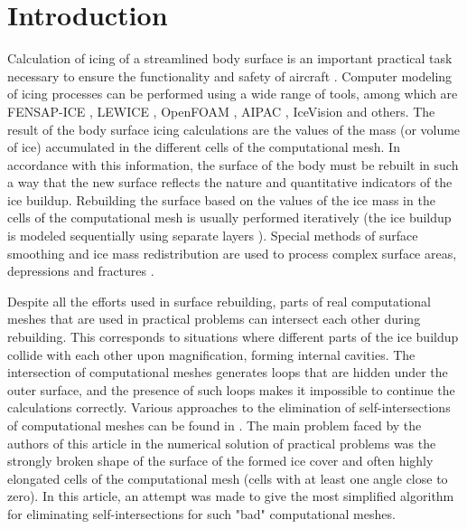 \documentclass[
11pt,%
tightenlines,%
twoside,%
onecolumn,%
nofloats,%
nobibnotes,%
nofootinbib,%
superscriptaddress,%
noshowpacs,%
centertags]%
{revtex4}
\begin{document}
\maketitle

\section{Introduction}

Calculation of icing of a streamlined body surface is an important practical task necessary to ensure the functionality and safety of aircraft \cite{Myers, Farzaneh, Dong, Beaugendre}.
Computer modeling of icing processes can be performed using a wide range of tools, among which are FENSAP-ICE \cite{Bourgault}, LEWICE \cite{Wright}, OpenFOAM \cite{Beld}, AIPAC \cite{Domingos}, IceVision \cite{Aksenov} and others.
The result of the body surface icing calculations are the values of the mass (or volume of ice) accumulated in the different cells of the computational mesh.
In accordance with this information, the surface of the body must be rebuilt in such a way that the new surface reflects the nature and quantitative indicators of the ice buildup.
Rebuilding the surface based on the values of the ice mass in the cells of the computational mesh is usually performed iteratively (the ice buildup is modeled sequentially using separate layers \cite{BourgaultCote, Fortin}).
Special methods of surface smoothing and ice mass redistribution are used to process complex surface areas, depressions and fractures \cite{Thompson, Tong}.

Despite all the efforts used in surface rebuilding, parts of real computational meshes that are used in practical problems can intersect each other during rebuilding.
This corresponds to situations where different parts of the ice buildup collide with each other upon magnification, forming internal cavities.
The intersection of computational meshes generates loops that are hidden under the outer surface, and the presence of such loops makes it impossible to continue the calculations correctly.
Various approaches to the elimination of self-intersections of computational meshes can be found in \cite{Charton, Jung, Skorkovska}.
The main problem faced by the authors of this article in the numerical solution of practical problems was the strongly broken shape of the surface of the formed ice cover and often highly elongated cells of the computational mesh (cells with at least one angle close to zero).
In this article, an attempt was made to give the most simplified algorithm for eliminating self-intersections for such "bad" computational meshes.
\end{document}
